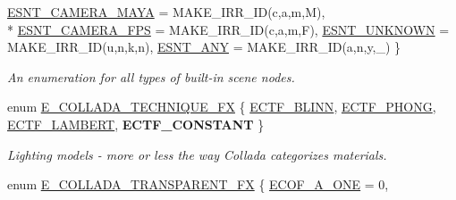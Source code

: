 \begin{DoxyCompactItemize}
\hyperlink{namespaceirr_1_1scene_acad3d7ef92a9807d391ba29120f3b7bda0f55e02501e38f435f1cca657983f933}{E\+S\+N\+T\+\_\+\+C\+A\+M\+E\+R\+A\+\_\+\+M\+A\+YA} = M\+A\+K\+E\+\_\+\+I\+R\+R\+\_\+\+ID(\textquotesingle{}c\textquotesingle{},\textquotesingle{}a\textquotesingle{},\textquotesingle{}m\textquotesingle{},\textquotesingle{}M\textquotesingle{}), 
\\*
\hyperlink{namespaceirr_1_1scene_acad3d7ef92a9807d391ba29120f3b7bdacbc402c4f01adcc87f3f8e9c004bdcd6}{E\+S\+N\+T\+\_\+\+C\+A\+M\+E\+R\+A\+\_\+\+F\+PS} = M\+A\+K\+E\+\_\+\+I\+R\+R\+\_\+\+ID(\textquotesingle{}c\textquotesingle{},\textquotesingle{}a\textquotesingle{},\textquotesingle{}m\textquotesingle{},\textquotesingle{}F\textquotesingle{}), 
\hyperlink{namespaceirr_1_1scene_acad3d7ef92a9807d391ba29120f3b7bda0c24ab203e5e0dc055f82fbca65d4f47}{E\+S\+N\+T\+\_\+\+U\+N\+K\+N\+O\+WN} = M\+A\+K\+E\+\_\+\+I\+R\+R\+\_\+\+ID(\textquotesingle{}u\textquotesingle{},\textquotesingle{}n\textquotesingle{},\textquotesingle{}k\textquotesingle{},\textquotesingle{}n\textquotesingle{}), 
\hyperlink{namespaceirr_1_1scene_acad3d7ef92a9807d391ba29120f3b7bdaa61d9ba5a5ec51a33600f83fb8bd71f5}{E\+S\+N\+T\+\_\+\+A\+NY} = M\+A\+K\+E\+\_\+\+I\+R\+R\+\_\+\+ID(\textquotesingle{}a\textquotesingle{},\textquotesingle{}n\textquotesingle{},\textquotesingle{}y\textquotesingle{},\textquotesingle{}\+\_\+\textquotesingle{})
 \}\begin{DoxyCompactList}\small\item\em An enumeration for all types of built-\/in scene nodes. \end{DoxyCompactList}
\item 
enum \hyperlink{namespaceirr_1_1scene_a9ec31e84e05295892488296b0741e2b1}{E\+\_\+\+C\+O\+L\+L\+A\+D\+A\+\_\+\+T\+E\+C\+H\+N\+I\+Q\+U\+E\+\_\+\+FX} \{ \hyperlink{namespaceirr_1_1scene_a9ec31e84e05295892488296b0741e2b1a69a2ffe63b7956eaedd3862f25d94d51}{E\+C\+T\+F\+\_\+\+B\+L\+I\+NN}, 
\hyperlink{namespaceirr_1_1scene_a9ec31e84e05295892488296b0741e2b1a48c8725416499c9909726e14f18c3fce}{E\+C\+T\+F\+\_\+\+P\+H\+O\+NG}, 
\hyperlink{namespaceirr_1_1scene_a9ec31e84e05295892488296b0741e2b1aef79736ffe4a0d7653644c7082061726}{E\+C\+T\+F\+\_\+\+L\+A\+M\+B\+E\+RT}, 
{\bfseries E\+C\+T\+F\+\_\+\+C\+O\+N\+S\+T\+A\+NT}
 \}\begin{DoxyCompactList}\small\item\em Lighting models -\/ more or less the way Collada categorizes materials. \end{DoxyCompactList}
\item 
enum \hyperlink{namespaceirr_1_1scene_af7dadd5b96b683cfe1800f343c4f6619}{E\+\_\+\+C\+O\+L\+L\+A\+D\+A\+\_\+\+T\+R\+A\+N\+S\+P\+A\+R\+E\+N\+T\+\_\+\+FX} \{ \hyperlink{namespaceirr_1_1scene_af7dadd5b96b683cfe1800f343c4f6619a93b8dbd819a9860581193a60ed6155c6}{E\+C\+O\+F\+\_\+\+A\+\_\+\+O\+NE} = 0, 

\end{DoxyCompactItemize}
